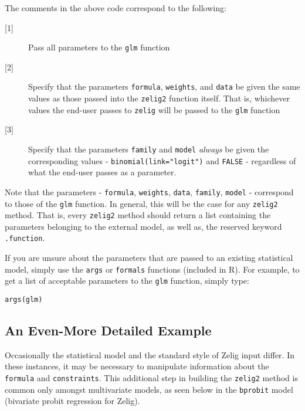 \documentclass{article}
\newcommand{\code}[1]{{\tt #1}}
\begin{document}
\noindent The comments in the above code correspond to the following:

\begin{description}
	\item[{[1]}] Pass all parameters to the \code{glm} function

	\item[{[2]}] Specify that the parameters \code{formula}, \code{weights}, and \code{data} be given the same values as those passed into the \code{zelig2} function itself. That is, whichever values the end-user passes to \code{zelig} will be passed to the \code{glm} function

	\item[{[3]}] Specify that the parameters \code{family} and \code{model} \emph{always} be given the corresponding values - \code{binomial(link="logit")} and \code{FALSE} - regardless of what the end-user passes as a parameter.
	
\end{description}

Note that the parameters - \code{formula}, \code{weights}, \code{data}, \code{family}, \code{model} - correspond to those of the \code{glm} function. In general, this will be the case for any \code{zelig2} method. That is, every \code{zelig2} method should return a list containing the parameters belonging to the external model, as well as, the reserved keyword \code{.function}.

If you are unsure about the parameters that are passed to an existing statistical model, simply use the \code{args} or \code{formals} functions (included in R). For example, to get a list of acceptable parameters to the \code{glm} function, simply type:

\begin{verbatim}
args(glm)
\end{verbatim}


\subsection{An Even-More Detailed Example}

{\noindent}Occasionally the statistical model and the standard style of Zelig input differ. In these instances, it may be necessary to manipulate information about the \code{formula} and \code{constraints}. This additional step in building the \code{zelig2} method is common only amongst multivariate models, as seen below in the \code{bprobit} model (bivariate probit regression for Zelig).
\end{document}
